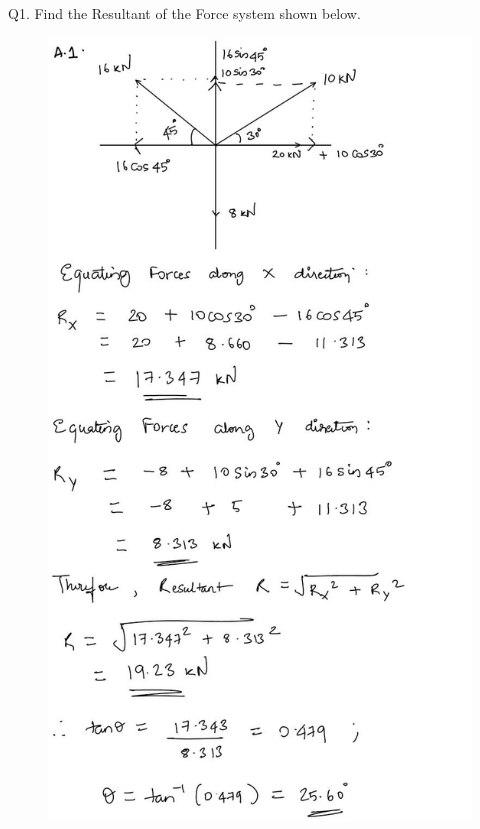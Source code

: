 \documentclass[11pt]{article}
\begin{document}
Q1. Find the Resultant of the Force system shown below. 
\begin{figure}[H]
	\includegraphics[scale=0.4]{a1.jpg}
	\label{fig: Polygon Law}
\end{figure}
\end{document}
